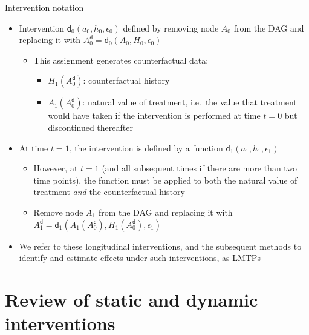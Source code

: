\documentclass[
  10pt,
  ignorenonframetext,
]{beamer}
\providecommand{\tightlist}{%
  \setlength{\itemsep}{0pt}\setlength{\parskip}{0pt}}\usepackage{longtable,booktabs,array}
\begin{document}
\begin{frame}{Intervention notation}
\protect\hypertarget{intervention-notation-1}{}
\begin{itemize}
\tightlist
\item
  Intervention \(\mathsf{d}_0(a_0, h_0, \epsilon_0)\) defined by
  removing node \(A_0\) from the DAG and replacing it with
  \(A_0^\mathsf{d}= \mathsf{d}_0(A_0, H_0, \epsilon_0)\)

  \begin{itemize}
  \tightlist
  \item
    This assignment generates counterfactual data:

    \begin{itemize}
    \tightlist
    \item
      \(H_1(A_0^\mathsf{d})\): counterfactual history
    \item
      \(A_1(A_0^\mathsf{d})\): natural value of treatment, i.e.~the
      value that treatment would have taken if the intervention is
      performed at time \(t=0\) but discontinued thereafter
    \end{itemize}
  \end{itemize}
\item
  At time \(t=1\), the intervention is defined by a function
  \(\mathsf{d}_1(a_1, h_1, \epsilon_1)\)

  \begin{itemize}
  \tightlist
  \item
    However, at \(t=1\) (and all subsequent times if there are more than
    two time points), the function must be applied to both the natural
    value of treatment \emph{and} the counterfactual history
  \item
    Remove node \(A_1\) from the DAG and replacing it with
    \(A_1^\mathsf{d}= \mathsf{d}_1(A_1(A_0^\mathsf{d}), H_1(A_0^\mathsf{d}), \epsilon_1)\)
  \end{itemize}
\item
  We refer to these longitudinal interventions, and the subsequent
  methods to identify and estimate effects under such interventions, as
  LMTPs
\end{itemize}
\end{frame}

\hypertarget{review-of-static-and-dynamic-interventions}{%
\section{Review of static and dynamic
interventions}\label{review-of-static-and-dynamic-interventions}}
\end{document}
